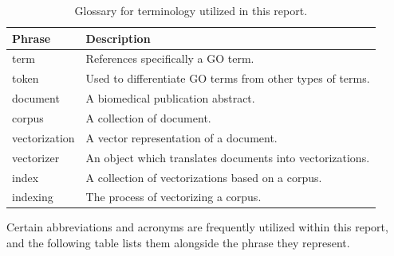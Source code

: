 \documentclass[11pt]{article}
\theoremstyle{plain}
\theoremstyle{definition}
\begin{document}
\begin{table}[H]
    \centering
    \begin{tabular}{| m{10em}  |m{20em} |}
        \hline
        Phrase        & Description                                                \\
        \hline
        \hline
        term          & References specifically a GO term.                         \\
        \hline
        token         & Used to differentiate GO terms from other types of terms.  \\
        \hline
        document      & A biomedical publication abstract.                         \\
        \hline
        corpus        & A collection of document.                                  \\
        \hline
        vectorization & A vector representation of a document.                     \\
        \hline
        vectorizer    & An object which translates documents into  vectorizations. \\
        \hline
        index         & A collection of vectorizations based on a corpus.          \\
        \hline
        indexing      & The process of vectorizing a corpus.                       \\
        \hline
    \end{tabular}
    \caption{Glossary for terminology utilized in this report.}\label{tab:terminology}
\end{table}

Certain abbreviations and acronyms are frequently utilized within this report, and the following table lists them alongside the phrase they represent.
\end{document}
